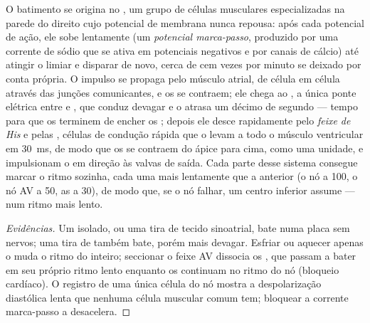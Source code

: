 \begin{proposition}\label{prop:b2:heart:conduction}
O batimento se origina no \emph{}, um grupo de células
musculares especializadas na parede do  direito cujo potencial de
membrana nunca repousa: após cada potencial de ação, ele sobe
lentamente (um \emph{potencial marca-passo}, produzido por uma corrente
de sódio que se ativa em potenciais negativos e por canais de cálcio)
até atingir o limiar e disparar de novo, cerca de cem vezes por minuto
se deixado por conta própria. O impulso se propaga pelo músculo
atrial, de célula em célula através das junções comunicantes, e os
 se contraem; ele chega ao \emph{}, a única
ponte elétrica entre  e , que conduz devagar e o
atrasa um décimo de segundo --- tempo para que os  terminem de
encher os ; depois ele desce rapidamente pelo \emph{feixe
de His} e pelas \emph{}, células de condução rápida
que o levam a todo o músculo ventricular em \qty{30}{ms}, de modo que
os  se contraem do ápice para cima, como uma unidade, e
impulsionam o  em direção às valvas de saída. Cada parte desse
sistema consegue marcar o ritmo sozinha, cada uma mais lentamente que a
anterior (o nó a 100, o nó AV a 50, as  a 30), de
modo que, se o nó falhar, um centro inferior assume --- num ritmo mais
lento.
\end{proposition}
\begin{proof}[Evidências]
Um  isolado, ou uma tira de tecido sinoatrial, bate numa placa
sem nervos; uma tira de  também bate, porém mais devagar.
Esfriar ou aquecer apenas o  muda o ritmo do 
inteiro; seccionar o feixe AV dissocia os , que passam a
bater em seu próprio ritmo lento enquanto os  continuam no ritmo
do nó (bloqueio cardíaco). O registro de uma única célula do nó mostra
a despolarização diastólica lenta que nenhuma célula muscular comum
tem; bloquear a corrente marca-passo a desacelera.
\end{proof}


